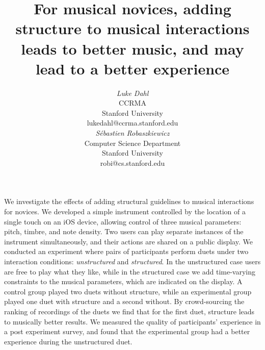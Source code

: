 \documentclass{article}
\begin{document}




\title{For musical novices, adding structure to musical interactions leads to better music, and may lead to a better experience}


\author{
\parbox[t]{9cm}{\centering
	     {\em Luke Dahl}\\
	     CCRMA\\
	     Stanford University\\
	     lukedahl@ccrma.stanford.edu}
\parbox[t]{9cm}{\centering
	     {\em S\'ebastien Robaszkiewicz}\\
	     Computer Science Department\\
	     Stanford University\\
	     robi@cs.stanford.edu}
}

\maketitle

\abstract
We investigate the effects of adding structural guidelines to musical interactions for novices. We developed a simple instrument controlled by the location of a single touch on an iOS device, allowing control of three musical parameters: pitch, timbre, and note density.  Two users can play separate instances of the instrument simultaneously, and their actions are shared on a public display.  We conducted an experiment where pairs of participants perform duets under two interaction conditions: \emph{unstructured} and \emph{structured}.  In the unstructured case users are free to play what they like, while in the structured case we add time-varying constraints to the musical parameters, which are indicated on the display. A control group played two duets without structure, while an experimental group played one duet with structure and a second without. By crowd-sourcing the ranking of recordings of the duets we find that for the first duet, structure leads to musically better results. We measured the quality of participants' experience in a post experiment survey, and found that the experimental group had a better experience during the unstructured duet.
\end{document}
